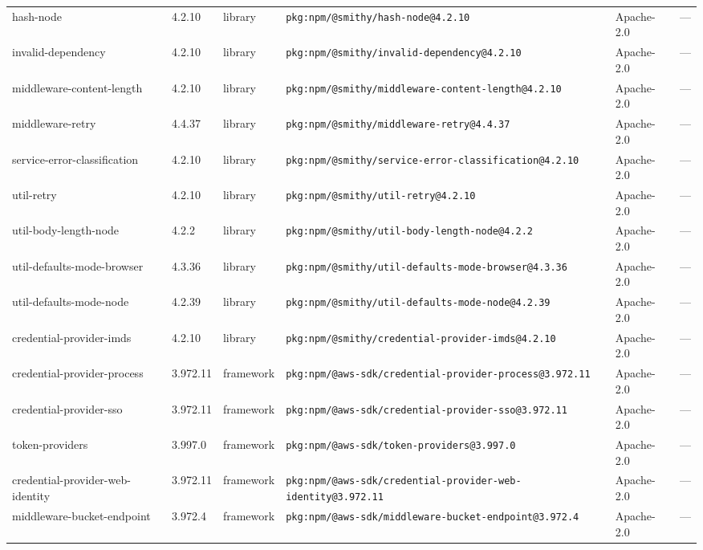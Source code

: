 \documentclass[11pt,a4paper]{article}
\begin{document}
\begin{longtable}{|p{4cm}|p{2cm}|p{1.6cm}|p{5cm}|p{1.5cm}|p{3.5cm}|}
\raggedright hash-node & 4.2.10 & library & \small\texttt{pkg:npm/@smithy/hash-node@4.2.10} & Apache-2.0 & \small — \\
\raggedright invalid-dependency & 4.2.10 & library & \small\texttt{pkg:npm/@smithy/invalid-dependency@4.2.10} & Apache-2.0 & \small — \\
\raggedright middleware-content-length & 4.2.10 & library & \small\texttt{pkg:npm/@smithy/middleware-content-length@4.2.10} & Apache-2.0 & \small — \\
\raggedright middleware-retry & 4.4.37 & library & \small\texttt{pkg:npm/@smithy/middleware-retry@4.4.37} & Apache-2.0 & \small — \\
\raggedright service-error-classification & 4.2.10 & library & \small\texttt{pkg:npm/@smithy/service-error-classification@4.2.10} & Apache-2.0 & \small — \\
\raggedright util-retry & 4.2.10 & library & \small\texttt{pkg:npm/@smithy/util-retry@4.2.10} & Apache-2.0 & \small — \\
\raggedright util-body-length-node & 4.2.2 & library & \small\texttt{pkg:npm/@smithy/util-body-length-node@4.2.2} & Apache-2.0 & \small — \\
\raggedright util-defaults-mode-browser & 4.3.36 & library & \small\texttt{pkg:npm/@smithy/util-defaults-mode-browser@4.3.36} & Apache-2.0 & \small — \\
\raggedright util-defaults-mode-node & 4.2.39 & library & \small\texttt{pkg:npm/@smithy/util-defaults-mode-node@4.2.39} & Apache-2.0 & \small — \\
\raggedright credential-provider-imds & 4.2.10 & library & \small\texttt{pkg:npm/@smithy/credential-provider-imds@4.2.10} & Apache-2.0 & \small — \\
\raggedright credential-provider-process & 3.972.11 & framework & \small\texttt{pkg:npm/@aws-sdk/credential-provider-process@3.972.11} & Apache-2.0 & \small — \\
\raggedright credential-provider-sso & 3.972.11 & framework & \small\texttt{pkg:npm/@aws-sdk/credential-provider-sso@3.972.11} & Apache-2.0 & \small — \\
\raggedright token-providers & 3.997.0 & framework & \small\texttt{pkg:npm/@aws-sdk/token-providers@3.997.0} & Apache-2.0 & \small — \\
\raggedright credential-provider-web-identity & 3.972.11 & framework & \small\texttt{pkg:npm/@aws-sdk/credential-provider-web-identity@3.972.11} & Apache-2.0 & \small — \\
\raggedright middleware-bucket-endpoint & 3.972.4 & framework & \small\texttt{pkg:npm/@aws-sdk/middleware-bucket-endpoint@3.972.4} & Apache-2.0 & \small — \\

\end{longtable}
\end{document}
